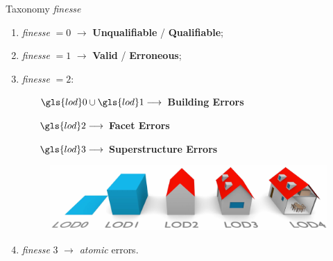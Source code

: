 \documentclass{beamer}
\begin{document}
            \begin{frame}{Taxonomy \emph{finesse}}
                \begin{enumerate}[label = (\roman*)., font=\color{IGNGreen}]
                    \item<1-> \emph{finesse} $= 0$ $\longrightarrow$ \textbf{Unqualifiable} / \textbf{Qualifiable};
                    \item<2-> \emph{finesse} $= 1$ $\longrightarrow$ \textbf{Valid} / \textbf{Erroneous};
                    \item<3-> \emph{finesse} $= 2$:
                    \begin{itemize}[leftmargin=12em, font=\color{IGNDarkOrange}]
                        \item[$\gls{lod}0 \cup \gls{lod}1 \longrightarrow$] \textbf{Building Errors}
                        \item[$\gls{lod}2 \longrightarrow$] \textbf{Facet Errors}
                        \item[$\gls{lod}3 \longrightarrow$] \textbf{Superstructure Errors}
                    \end{itemize}
                    \begin{figure}[H]
                        \begin{center}
                            \includegraphics[height=.2\textheight]{images/citygml_lod}
                        \end{center}
                    \end{figure}
                    \item<4-> \emph{finesse} $3$ $\longrightarrow$ \emph{atomic} errors.
                \end{enumerate}

            \end{frame}
\end{document}
